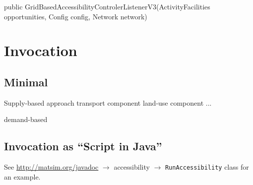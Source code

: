 public GridBasedAccessibilityControlerListenerV3(ActivityFacilities opportunities, Config config, Network network)

\section{Invocation}

\subsection{Minimal}

Supply-based approach
transport component
land-use component
...


demand-based



\subsection{Invocation as \enquote{Script in Java}}

See \url{http://matsim.org/javadoc} $\to$ accessibility $\to$ \lstinline{RunAccessibility} class for an example.




